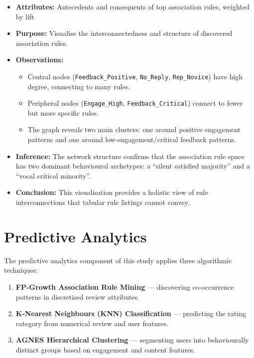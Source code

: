 \documentclass[12pt,a4paper]{article}
\begin{document}
\begin{itemize}[nosep]
    \item \textbf{Attributes:} Antecedents and consequents of top association rules, weighted by lift
    \item \textbf{Purpose:} Visualise the interconnectedness and structure of discovered association rules.
    \item \textbf{Observations:}
    \begin{itemize}[nosep]
        \item Central nodes (\texttt{Feedback\_Positive}, \texttt{No\_Reply}, \texttt{Rep\_Novice}) have high degree, connecting to many rules.
        \item Peripheral nodes (\texttt{Engage\_High}, \texttt{Feedback\_Critical}) connect to fewer but more specific rules.
        \item The graph reveals two main clusters: one around positive engagement patterns and one around low-engagement/critical feedback patterns.
    \end{itemize}
    \item \textbf{Inference:} The network structure confirms that the association rule space has two dominant behavioural archetypes: a ``silent satisfied majority'' and a ``vocal critical minority''.
    \item \textbf{Conclusion:} This visualisation provides a holistic view of rule interconnections that tabular rule listings cannot convey.
\end{itemize}

\section{Predictive Analytics}

The predictive analytics component of this study applies three algorithmic techniques:

\begin{enumerate}[nosep]
    \item \textbf{FP-Growth Association Rule Mining} --- discovering co-occurrence patterns in discretised review attributes.
    \item \textbf{K-Nearest Neighbours (KNN) Classification} --- predicting the rating category from numerical review and user features.
    \item \textbf{AGNES Hierarchical Clustering} --- segmenting users into behaviourally distinct groups based on engagement and content features.
\end{enumerate}
\end{document}
